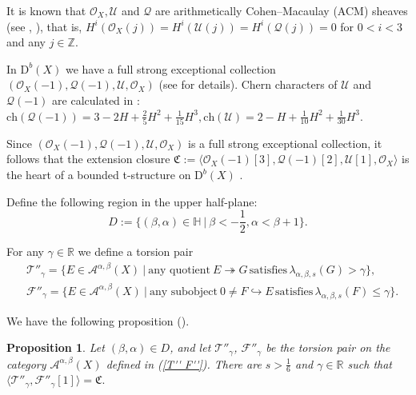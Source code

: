 \documentclass{amsart}
\newcommand{\into}{\hookrightarrow}
\newcommand{\onto}{\twoheadrightarrow}
\def\R{\ensuremath{\mathbb{R}}}
\def\FF{\ensuremath{\mathcal F}}
\def\TT{\ensuremath{\mathcal T}}
\newtheorem{proposition}[theorem]{Proposition}
\begin{document}
	It is known that $\mathcal O_X,\mathcal U$ and $\mathcal Q$ are arithmetically Cohen--Macaulay (ACM) sheaves (see \cite[Proposition 5.2]{Faenzi}, \cite[Proposition 5.7]{Faenzi}), that is, $H^i(\mathcal O_X(j))=H^i(\mathcal U(j))=H^i(\mathcal Q(j))=0$ for $0<i<3$ and any $j\in\mathbb Z$.
	
	In $\mathrm{D}^b(X)$ we have a full strong exceptional collection $(\mathcal O_X(-1),\mathcal Q(-1),\mathcal U,\mathcal O_X)$ (see \cite{Vass} for details). Chern characters of $\mathcal U$ and $\mathcal Q(-1)$ are calculated in \cite[Lemma 2.11]{Vass}: $\mathrm{ch}(\mathcal Q(-1))=3-2H+\frac 25H^2+\frac{1}{15}H^3,\mathrm{ch}(\mathcal U)=2-H+\frac{1}{10}H^2+\frac{1}{30}H^3$.
	
	Since $(\mathcal O_X(-1),\mathcal Q(-1),\mathcal U,\mathcal O_X)$ is a full strong exceptional collection, it follows that the extension closure $\mathfrak C:=\langle\mathcal O_{X}(-1)[3],\mathcal Q(-1)[2],\mathcal U[1],\mathcal O_{X}\rangle$ is the heart of a bounded t-structure on $\mathrm{D}^b(X)$ \cite[Lemma 3.14]{Curves}.
	
	Define the following region in the upper half-plane:
	\begin{equation}\label{D}D:=\{(\beta,\alpha)\in\mathbb H\ |\ \beta< -\frac 12,\alpha<\beta+1\}.\end{equation}
	
	For any	$\gamma\in\mathbb R$ we define a torsion pair
		\begin{equation}\label{T'' F''}
				\begin{split}
						& \TT''_{\gamma}=\{E\in\mathcal A^{\alpha,\beta}(X)\ |\ \text{any quotient}\ E\onto G
						\,\text{satisfies}\,\lambda_{\alpha,\beta, s}(G)>\gamma \}, \\
						& \FF''_{\gamma} = \{E \in \mathcal A^{\alpha, \beta}(X)\ |\ \text{any
								subobject}\ 0\ne F\into E\,\text{satisfies}\, \lambda_{\alpha,\beta, s}(F)\leq\gamma\}.
					\end{split}
			\end{equation}
	
	We have the following proposition (\cite[Corollary 2.15]{Vass}).
	
	\begin{proposition}\label{heart}Let $(\beta,\alpha)\in D$, and let $ \TT''_{\gamma}$, $\FF''_{\gamma}$ be the torsion pair on the category $\mathcal A^{\alpha,\beta}(X)$ defined in (\ref{T'' F''}). There are $s>\frac 16$ and $\gamma\in\R$ such that
		$\langle \mathcal T''_{\gamma},\mathcal F''_{\gamma}[1]\rangle =\mathfrak C.$
	\end{proposition}
	
\end{document}
